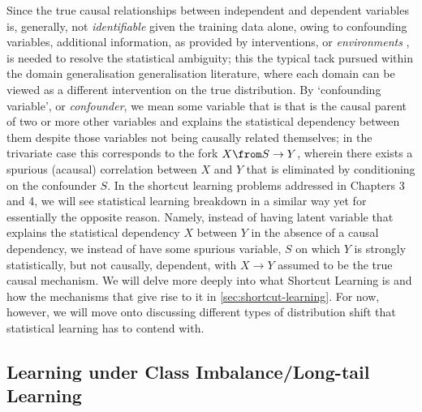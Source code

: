 Since the true causal relationships between independent and dependent variables is, generally, not
\emph{identifiable} given the training data alone, owing to confounding variables, additional
information, as provided by interventions, or \emph{environments} \citep{peters2016causal}, is
needed to resolve the statistical ambiguity; this the typical tack pursued within the domain
generalisation generalisation literature, where each domain can be viewed as a different
intervention on the true distribution.
%
By `confounding variable', or \emph{confounder}, we mean some variable that is that is
the causal parent of two or more other variables and explains the statistical dependency between
them despite those variables not being causally related themselves; in the trivariate case this
corresponds to the fork \(X \from S \to Y \), wherein there exists a spurious (acausal) correlation
between \(X\) and \(Y\) that is eliminated by conditioning on the confounder \(S\).
%
In the shortcut learning problems addressed in Chapters 3 and 4, we will see statistical learning
breakdown in a similar way yet for essentially the opposite reason.
%
Namely, instead of having latent variable that explains the statistical dependency \(X\) between
\(Y\) in the absence of a causal dependency, we instead of have some spurious variable, \(S\) on
which \(Y\) is strongly statistically, but not causally, dependent, with \(X \to Y \) assumed to be
the true causal mechanism.
%
We will delve more deeply into what Shortcut Learning is and how the mechanisms that give rise to
it in \ref{sec:shortcut-learning}.
%
For now, however, we will move onto discussing different types of distribution shift that
statistical learning has to contend with.


\subsection{Learning under Class Imbalance/Long-tail Learning}

